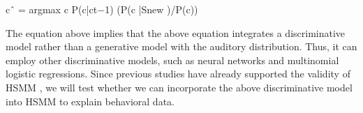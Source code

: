 \documentclass[a4paper,11pt,twocolumn]{article}
\begin{document}
cˆ = argmax c P(c|ct−1) (P(c |Snew )/P(c))

The equation above implies that the above equation integrates a discriminative model rather than a generative model with the auditory distribution. Thus, it can employ other discriminative models, such as neural networks and multinomial logistic regressions. Since previous studies have already supported the validity of HSMM \cite{kishiyama2021}, we will test whether we can incorporate the above discriminative model into HSMM to explain behavioral data.




\theendnotes
\end{document}
